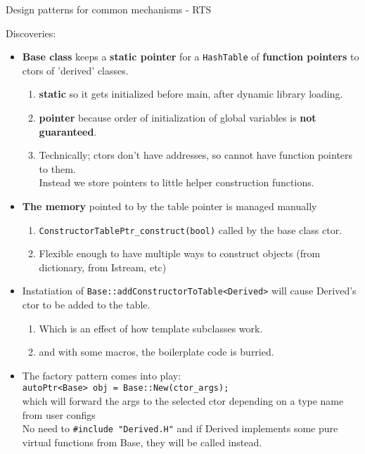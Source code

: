 \begin{frame}{Design patterns for common mechanisms - RTS}

Discoveries:

\begin{itemize}
    \item {\bf Base class} keeps a {\bf static pointer} for a {\tt HashTable}
        of {\bf function pointers} to ctors of 'derived' classes.
        \begin{enumerate}
            \item {\bf static} so it gets initialized before main, after dynamic library loading.
            \item {\bf pointer} because order of initialization of global variables is {\bf not guaranteed}.
            \item Technically; ctors don't have addresses, so cannot have function pointers to them.\\
                Instead we store pointers to little helper construction functions.
        \end{enumerate}
    \item {\bf The memory} pointed to by the table pointer is managed manually
        \begin{enumerate}
            \item {\tt \*ConstructorTablePtr\_construct(bool)} called by the base class ctor.
            \item Flexible enough to have multiple ways to construct objects (from dictionary, from Istream, etc)
        \end{enumerate}
    \pagebreak
    \item Instatiation of {\tt Base::add\*ConstructorToTable<Derived>} will cause Derived's ctor to be added to the table.
        \begin{enumerate}
            \item Which is an effect of how template subclasses work.
            \item and with some macros, the boilerplate code is burried.
        \end{enumerate}
    \item The factory pattern comes into play:\\
        \texttt{autoPtr<Base> obj = Base::New(ctor_args);}\\
        which will forward the args to the selected ctor depending on a type name from user configs\\
        No need to \texttt{#include "Derived.H"} and if Derived implements some
        pure virtual functions from Base, they will be called instead.
\end{itemize}
\end{frame}

